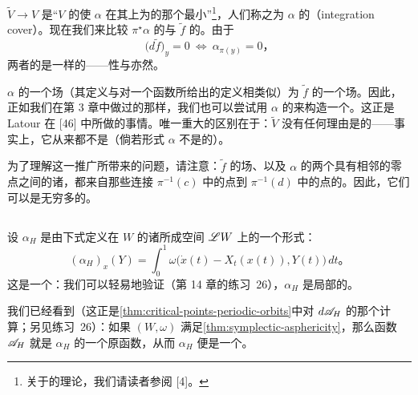 \trCovering{} $\widetilde{V}\to V$ 是“$V$ 的使 $\alpha$ 在其上为\trExact{}的那个最小\trCovering”\footnote{关于\trCovering{}的理论，我们请读者参阅 [4]。}，人们称之为 $\alpha$ 的\textbf{\trIntegrationCover}（integration cover）。现在我们来比较 $\pi^\star\alpha$ 的\trCriticalPoint{}与 $\widetilde{f}$ 的\trCriticalPoint。由于
\[
\bigl(d\widetilde{f}\bigr)_y=0\ \Longleftrightarrow\ \alpha_{\pi(y)}=0\text{，}
\]
两者的\trCriticalPoint{}是一样的——\trNondegenerate{}性与\trIndex{}亦然。

$\alpha$ 的一个\trPseudogradient{}场（其定义与对一个函数所给出的定义相类似）\trLift{}为 $\widetilde{f}$ 的一个\trPseudogradient{}场。因此，正如我们在第 3 章中做过的那样，我们也可以尝试用 $\alpha$ 的\trCriticalPoint{}来构造一个\trComplex。这正是 Latour 在 [46] 中所做的事情。唯一重大的区别在于：$\widetilde{V}$ 没有任何理由是\trCompact{}的——事实上，它从来都不是（倘若形式 $\alpha$ 不是\trExact{}的）。

为了理解这一推广所带来的问题，请注意：$\widetilde{f}$ 的\trPseudogradient{}场、以及 $\alpha$ 的两个具有相邻\trIndex{}的零点之间的诸\trTrajectory，都来自那些连接 $\pi^{-1}(c)$ 中的点到 $\pi^{-1}(d)$ 中的点的\trTrajectory。因此，它们可以是无穷多的。

\subsection{\trActionForm}
\label{subsec:action-form}

设 $\alpha_H$ 是由下式定义在 $W$ 的诸\trContractible{}\trLoop{}所成空间 $\mathscr{L}W$ 上的一个形式：
\[
(\alpha_H)_x(Y)=\int_0^1\omega\bigl(\dot{x}(t)-X_t(x(t)),Y(t)\bigr)\,dt\text{。}
\]
这是一个\trClosed\trForm：我们可以轻易地验证（第 14 章的练习~26），$\alpha_H$ 是局部\trExact{}的。

我们已经看到（这正是\cref{thm:critical-points-periodic-orbits}中对 $d\mathscr{A}_H$ 的那个计算；另见练习~26）：如果\trSymplectic\trManifold{} $(W,\omega)$ 满足\cref{thm:symplectic-asphericity}，那么函数 $\mathscr{A}_H$ 就是 $\alpha_H$ 的一个原函数，从而 $\alpha_H$ 便是一个\trExact\trForm。

